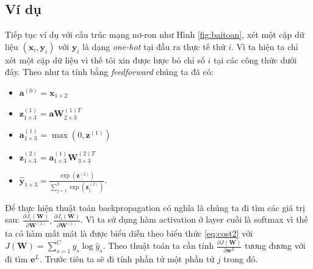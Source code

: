 \subsection{Ví dụ}
Tiếp tục ví dụ với cấu trúc mạng nơ-ron như Hình \ref{fig:baitoan}, xét một cặp dữ liệu $(\textbf{x}_i,\textbf{y}_i)$ với $\textbf{y}_i$ là dạng \textit{one-hot} tại đầu ra thực tế thứ $i$. Vì ta hiện ta chỉ xét một cặp dữ liệu vì thế tôi xin được lược bỏ chỉ số $i$ tại các công thức dưới đây. Theo như ta tính bằng \textit{feedforward }chúng ta đã có: 


\begin{itemize}
	\item[] $\textbf{a}^{(0)}=\textbf{x}_{1\times2}$
	\item[]  $\textbf{z}^{(1)}_{1 \times 3}=\textbf{a}\textbf{W}^{(1)T}_{2{\times}3}$
	\item[] $\textbf{a}^{(1)}_{1 \times 3}=\max(0,\textbf{z}^{(1)})$
	
	\item[] $\textbf{z}^{(2)}_{1\times 3}=\textbf{a}^{(1)}_{1 \times 3}\textbf{W}^{(2)T}_{3{{\times}}3 }$
	
	\item[] $\widehat{\textbf{y}}_{1\times 3} = \frac{\exp({\textbf{z}^{(2)}})}{\sum^{3}_{j=1}{\exp({\textbf{z}^{(2)}_j})}}$.

\end{itemize}
Để thực hiện thuật toán backpropagation có nghĩa là chúng ta đi tìm các giá trị sau: $\frac{\partial J_i(\textbf{W})}{\partial \textbf{W}^{(2)}},\frac{\partial J_i(\textbf{W})}{\partial \textbf{W}^{(1)}}$. Vì ta sử dụng hàm activation ở layer cuối là softmax vì thế ta có hàm mất mát là được biểu diễn theo biểu thức \ref{eq:cost2} với $J(\textbf{W})=\sum^{C}_{s=1} y_{s}{ \log \widehat{y}_{s}}$. Theo thuật toán ta cần tính $\frac{\partial J(\textbf{W})}{\partial \textbf{w}^{L}} $ tương đương với đi tìm $\textbf{e}^{L}$. Trước tiên ta sẽ đi tính phần tử một phần tử $j$ trong đó.

